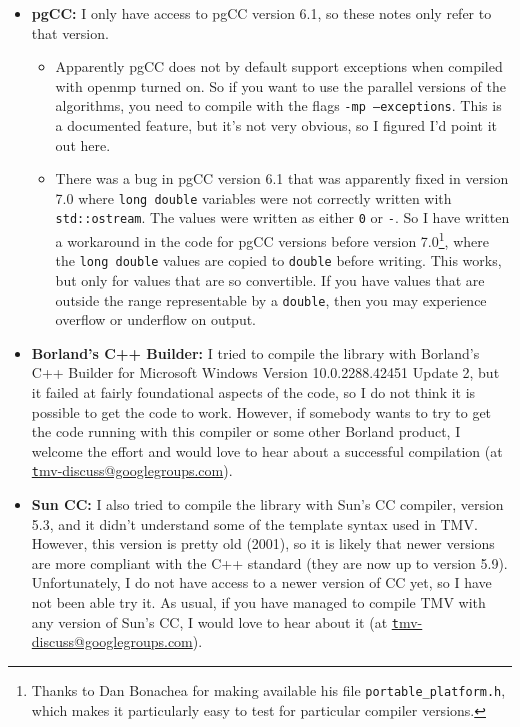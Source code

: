\documentclass[twoside,letterpaper,11pt]{article}
\makeatletter
\newcommand{\mygroupx}{tmv-discuss@googlegroups.com}
\newcommand{\mygroup}{\href{mailto:\mygroupx}{\texttt \mygroupx}}
\renewcommand{\tt}[1]{{\lstinline {#1}}}
\makeatother
\begin{document}
\begin{itemize}
\item {\bf pgCC:}
I only have access to pgCC version 6.1, so these notes only refer to that version.
\begin{itemize}
\item
Apparently pgCC does not by default support exceptions when compiled 
with openmp turned on.  
So if you want to use the parallel versions of the algorithms,
you need to compile with the flags \texttt{-mp --exceptions}.  This is a documented feature,
but it's not very obvious, so I figured I'd point it out here.

\item 
There was a bug in pgCC version 6.1 that was apparently fixed in version 7.0 where
\tt{long double} variables were not correctly written with \tt{std::ostream}.  The values
were written as either \tt{0} or \tt{-}.  So I have written a workaround in the code for
pgCC versions before version 7.0\footnote{
Thanks to Dan Bonachea for making available his file \texttt{portable\_platform.h},
which makes it particularly easy to test for particular compiler versions.},
where the \tt{long double} values are copied to 
\tt{double} before writing.  This works, but only for values that are so convertible.
If you have values that are outside the range representable by a \tt{double}, then 
you may experience overflow or underflow on output.

\end{itemize}

\item {\bf Borland's C++ Builder:}
I tried to compile the library with Borland's C++ Builder for Microsoft Windows
Version 10.0.2288.42451 Update 2, but it failed at fairly foundational aspects of the 
code, so I do not think it is possible to get the code to work.  However, if somebody wants
to try to get the code running with this compiler or some other Borland product, 
I welcome the effort and would
love to hear about a successful compilation (at \mygroup).

\item {\bf Sun CC:}
I also tried to compile the library with Sun's CC compiler, version 5.3, 
and it didn't understand some of the template syntax used in TMV.  However,
this version is pretty old (2001), so it is likely that newer versions are more
compliant with the C++ standard (they are now up to version 5.9).  
Unfortunately, I do not have access to a newer version of CC yet, so I have not
been able try it.  As usual, if you have managed to compile TMV with
any version of Sun's CC, I would love to hear about it (at \mygroup).


\end{itemize}
\end{document}
